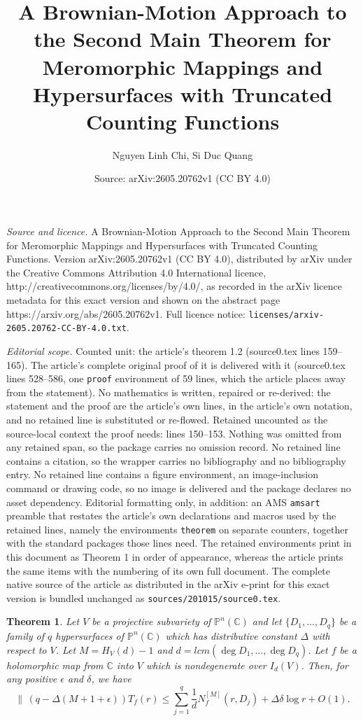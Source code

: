 \documentclass[10pt,a4paper]{amsart}
\title{A Brownian-Motion Approach to the Second Main Theorem for Meromorphic Mappings and Hypersurfaces with Truncated Counting Functions}
\author{Nguyen Linh Chi, Si Duc Quang}
\date{Source: arXiv:2605.20762v1 (CC BY 4.0)}
\newtheorem{theorem}{Theorem}
\newcommand{\C}{{\mathbb{C}}}
\renewcommand{\P}{{\mathbb{P}}}
\begin{document}
\maketitle

\noindent\emph{Source and licence.} A Brownian-Motion Approach to the Second Main Theorem for Meromorphic Mappings and Hypersurfaces with Truncated Counting Functions. Version arXiv:2605.20762v1 (CC BY 4.0), distributed by arXiv under the Creative Commons Attribution 4.0 International licence, http://creativecommons.org/licenses/by/4.0/, as recorded in the arXiv licence metadata for this exact version and shown on the abstract page https://arxiv.org/abs/2605.20762v1. Full licence notice: \texttt{licenses/arxiv-2605.20762-CC-BY-4.0.txt}.\par\smallskip

\noindent\textit{Editorial scope.} Counted unit: the article's theorem 1.2 (source0.tex lines 159--165). The article's complete original proof of it is delivered with it (source0.tex lines 528--586, one \texttt{proof} environment of 59 lines, which the article places away from the statement). No mathematics is written, repaired or re-derived: the statement and the proof are the article's own lines, in the article's own notation, and no retained line is substituted or re-flowed.  Retained uncounted as the source-local context the proof needs: lines 150--153.  Nothing was omitted from any retained span, so the package carries no omission record.  No retained line contains a citation, so the wrapper carries no bibliography and no bibliography entry.  No retained line contains a figure environment, an image-inclusion command or drawing code, so no image is delivered and the package declares no asset dependency.  Editorial formatting only, in addition: an AMS \texttt{amsart} preamble that restates the article's own declarations and macros used by the retained lines, namely the environments \texttt{theorem} on separate counters, together with the standard packages those lines need.  The retained environments print in this document as Theorem 1 in order of appearance, whereas the article prints the same items with the numbering of its own full document.  The complete native source of the article as distributed in the arXiv e-print for this exact version is bundled unchanged as \texttt{sources/201015/source0.tex}.
\begin{theorem}\label{1.1}
Let $V$ be a projective subvariety of $\P^n(\C)$ and let $\{D_1,\ldots,D_q\}$ be a family of $q$ hypersurfaces of $\P^n(\C)$ which has distributive constant $\Delta$ with respect to $V$. Let $M=H_V(d)-1$ and $d=lcm(\deg D_1,\ldots,\deg D_q)$. Let $f$ be a holomorphic map from $\C$ into $V$ which is nondegenerate over $I_d(V)$. Then, for any positive $\epsilon$ and $\delta$, we have
$$\|\,(q-\Delta(M+1+\epsilon))T_f(r)\le\sum_{j=1}^q\frac{1}{d}N^{[M]}_f(r,D_j)+\Delta\delta \log r + O(1).$$
\end{theorem}
\end{document}
